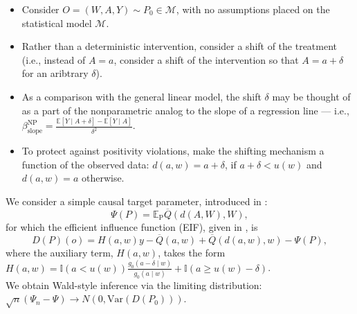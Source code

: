 \documentclass[landscape,a0paper,fontscale=0.285]{baposter} %
\begin{document}
\begin{poster}
{\begin{itemize}
  \itemsep1pt
  \item Consider $O = (W, A, Y) \sim P_0 \in \mathcal{M}$, with no assumptions
    placed on the statistical model $\mathcal{M}$.
  \item Rather than a deterministic intervention, consider a shift of the
    treatment (i.e., instead of $A = a$, consider a shift of the intervention so
    that $A = a + \delta$ for an aribtrary $\delta$).
  \item As a comparison with the general linear model, the shift $\delta$ may be
    thought of as a part of the nonparametric analog to the slope of a
    regression line --- i.e., $\beta^{\text{NP}}_{\text{slope}} =
      \frac{\mathbb{E}[Y \mid A + \delta] - \mathbb{E}[Y \mid A]}{\delta^2}$.
  \item To protect against positivity violations, make the shifting mechanism a
    function of the observed data: $d(a, w) = a + \delta$, if
    $a + \delta < u(w)$ and $d(a, w) = a$ otherwise.
\end{itemize}

We consider a simple causal target parameter, introduced in
  \cite{munoz2012population}:
\begin{equation}
\Psi(P) = \mathbb{E}_{\text{P}}{\overline{Q}(d(A, W), W)},
\end{equation}
for which the efficient influence function (EIF), given in
  \cite{diaz2018stochastic}, is
\begin{equation}
D(P)(o) = H(a, w){y - \overline{Q}(a, w)} + \overline{Q}(d(a, w), w) - \Psi(P),
\end{equation}
where the auxiliary term, $H(a,w)$, takes the form
  $H(a,w) = \mathbb{I}(a < u(w)) \frac{g_0(a - \delta \mid w)}{g_0(a \mid w)} +
    \mathbb{I}(a \geq u(w) - \delta)$.\\[0.5em]
We obtain Wald-style inference via the limiting distribution:
$\sqrt{n}(\Psi_n - \Psi) \to N(0, \text{Var}(D(P_0)))$.
}


\end{poster}
\end{document}

